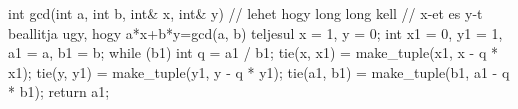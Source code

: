 int gcd(int a, int b, int& x, int& y) {
    // lehet hogy long long kell
    // x-et es y-t beallitja ugy, hogy a*x+b*y=gcd(a, b) teljesul
    x = 1, y = 0;
    int x1 = 0, y1 = 1, a1 = a, b1 = b;
    while (b1) {
        int q = a1 / b1;
        tie(x, x1) = make_tuple(x1, x - q * x1);
        tie(y, y1) = make_tuple(y1, y - q * y1);
        tie(a1, b1) = make_tuple(b1, a1 - q * b1);
    }
    return a1;
}
